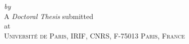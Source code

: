 \begin{titlepage}
  \vspace*{5cm}
  \makeatletter
  \begin{center}
    \begin{Huge}
      \@title
    \end{Huge}\\[0.1cm]
    \begin{Large}
      \@subtitle
    \end{Large}\\
    \emph{by}\\
    \@author
    \vfill
    A \emph{Doctoral Thesis} submitted\\
    at\\
    \textsc{Université de Paris, IRIF, CNRS, F-75013 Paris, France}
  \end{center}
  \makeatother
\end{titlepage}

\newpage
\null
\thispagestyle{empty}
\newpage
